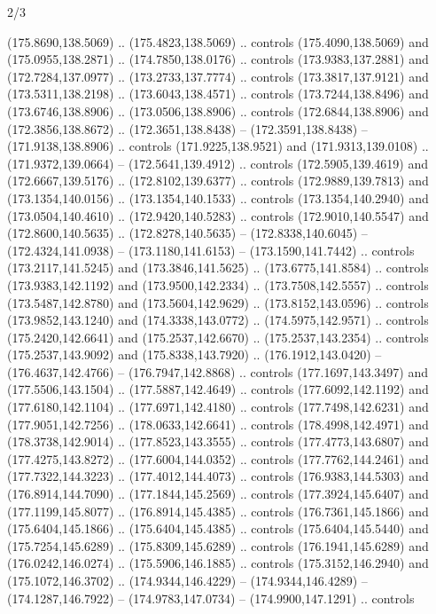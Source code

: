 \begin{flagdescription}{2/3}
\begin{scope}[xshift=0.5\flaglength,yshift=0.5\flagwidth,scale=\flagwidth/180]
\begin{scope}[y=0.8pt, x=0.8pt, yscale=-1,shift={(-168.75,-108.75)}]
  (175.8690,138.5069) .. (175.4823,138.5069) .. controls (175.4090,138.5069) and
  (175.0955,138.2871) .. (174.7850,138.0176) .. controls (173.9383,137.2881) and
  (172.7284,137.0977) .. (173.2733,137.7774) .. controls (173.3817,137.9121) and
  (173.5311,138.2198) .. (173.6043,138.4571) .. controls (173.7244,138.8496) and
  (173.6746,138.8906) .. (173.0506,138.8906) .. controls (172.6844,138.8906) and
  (172.3856,138.8672) .. (172.3651,138.8438) -- (172.3591,138.8438) --
  (171.9138,138.8906) .. controls (171.9225,138.9521) and (171.9313,139.0108) ..
  (171.9372,139.0664) -- (172.5641,139.4912) .. controls (172.5905,139.4619) and
  (172.6667,139.5176) .. (172.8102,139.6377) .. controls (172.9889,139.7813) and
  (173.1354,140.0156) .. (173.1354,140.1533) .. controls (173.1354,140.2940) and
  (173.0504,140.4610) .. (172.9420,140.5283) .. controls (172.9010,140.5547) and
  (172.8600,140.5635) .. (172.8278,140.5635) -- (172.8338,140.6045) --
  (172.4324,141.0938) -- (173.1180,141.6153) -- (173.1590,141.7442) .. controls
  (173.2117,141.5245) and (173.3846,141.5625) .. (173.6775,141.8584) .. controls
  (173.9383,142.1192) and (173.9500,142.2334) .. (173.7508,142.5557) .. controls
  (173.5487,142.8780) and (173.5604,142.9629) .. (173.8152,143.0596) .. controls
  (173.9852,143.1240) and (174.3338,143.0772) .. (174.5975,142.9571) .. controls
  (175.2420,142.6641) and (175.2537,142.6670) .. (175.2537,143.2354) .. controls
  (175.2537,143.9092) and (175.8338,143.7920) .. (176.1912,143.0420) --
  (176.4637,142.4766) -- (176.7947,142.8868) .. controls (177.1697,143.3497) and
  (177.5506,143.1504) .. (177.5887,142.4649) .. controls (177.6092,142.1192) and
  (177.6180,142.1104) .. (177.6971,142.4180) .. controls (177.7498,142.6231) and
  (177.9051,142.7256) .. (178.0633,142.6641) .. controls (178.4998,142.4971) and
  (178.3738,142.9014) .. (177.8523,143.3555) .. controls (177.4773,143.6807) and
  (177.4275,143.8272) .. (177.6004,144.0352) .. controls (177.7762,144.2461) and
  (177.7322,144.3223) .. (177.4012,144.4073) .. controls (176.9383,144.5303) and
  (176.8914,144.7090) .. (177.1844,145.2569) .. controls (177.3924,145.6407) and
  (177.1199,145.8077) .. (176.8914,145.4385) .. controls (176.7361,145.1866) and
  (175.6404,145.1866) .. (175.6404,145.4385) .. controls (175.6404,145.5440) and
  (175.7254,145.6289) .. (175.8309,145.6289) .. controls (176.1941,145.6289) and
  (176.0242,146.0274) .. (175.5906,146.1885) .. controls (175.3152,146.2940) and
  (175.1072,146.3702) .. (174.9344,146.4229) -- (174.9344,146.4289) --
  (174.1287,146.7922) -- (174.9783,147.0734) -- (174.9900,147.1291) .. controls

\end{scope}
\end{scope}
\end{flagdescription}
